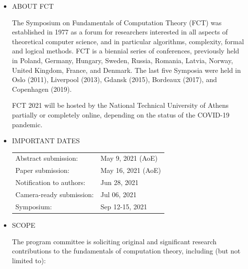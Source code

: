\documentclass[prodmode,acmtecs]{acmsmall} %
\begin{document}
\begin{itemize}\item  ABOUT FCT 
 
  The Symposium on Fundamentals of Computation Theory (FCT) was established in 1977 as a forum for researchers interested in all aspects of theoretical computer science, and in particular algorithms, complexity, formal and logical methods. FCT is a biennial series of conferences, previously held in Poland, Germany, Hungary, Sweden, Russia, Romania, Latvia, Norway, United Kingdom, France, and Denmark. The last five Symposia were held in Oslo (2011), Liverpool (2013), Gdansk (2015), Bordeaux (2017), and Copenhagen (2019). 
 
  FCT 2021 will be hosted by the National Technical University of Athens partially or completely online, depending on the status of the COVID-19 pandemic. 
 
\item  IMPORTANT DATES 
 
\begin{tabulary}{\linewidth}{LL}Abstract submission:  & May 9, 2021 (AoE) \\
Paper submission:  & May 16, 2021 (AoE) \\
Notification to authors:  & Jun 28, 2021 \\
Camera-ready submission:  & Jul 06, 2021 \\
Symposium:  & Sep 12-15, 2021 \\
\end{tabulary}
 
\item  SCOPE 
 
  The program committee is soliciting original and significant research contributions to the fundamentals of computation theory, including (but not limited to): 
 

\end{itemize}
\end{document}
